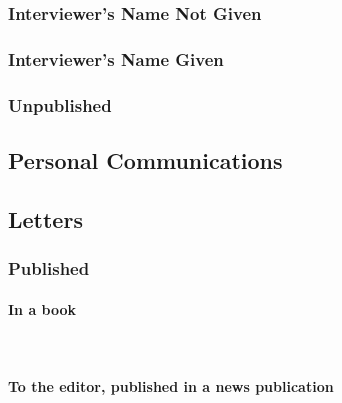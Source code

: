 \documentclass{ltxdockit}
\newcommand{\myparagraph}[1]{\paragraph{#1}\mbox{}\\}
\begin{document}
\subsubsection{Interviewer’s Name Not Given} %
\label{sub:interviewer_s_name_not_given}
\begin{refsection}
	\printbibliography[heading=none]
\end{refsection}
\subsubsection{Interviewer’s Name Given} %
\label{sub:interviewer_s_name_given}
\begin{refsection}
	\printbibliography[heading=none]
\end{refsection}
\subsubsection{Unpublished} %
\label{sub:unpublished_interview}
\begin{refsection}
	\printbibliography[heading=none]
\end{refsection}

\subsection{Personal Communications} %
\label{sec:personal_communications}
\begin{refsection}
	\printbibliography[heading=none]
\end{refsection}

\subsection{Letters} %
\label{sec:letters}
\subsubsection{Published} %
\label{sub:published}
\myparagraph{In a book} %
\label{ssub:in_a_book}
\begin{refsection}
	\printbibliography[heading=none]
\end{refsection}
\myparagraph{To the editor, published in a news publication} %
\label{ssub:to_the_editor_published_in_a_news_publication}
\begin{refsection}
	\printbibliography[heading=none]
\end{refsection}
\end{document}
